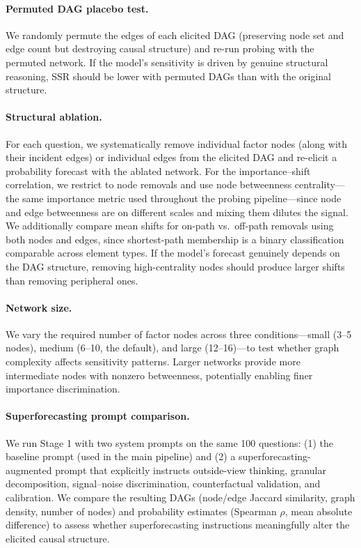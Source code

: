 \documentclass[11pt]{article}
\begin{document}
\paragraph{Permuted DAG placebo test.} We randomly permute the edges of each elicited DAG (preserving node set and edge count but destroying causal structure) and re-run probing with the permuted network. If the model's sensitivity is driven by genuine structural reasoning, SSR should be lower with permuted DAGs than with the original structure.

\paragraph{Structural ablation.} For each question, we systematically remove individual factor nodes (along with their incident edges) or individual edges from the elicited DAG and re-elicit a probability forecast with the ablated network. For the importance--shift correlation, we restrict to node removals and use node betweenness centrality---the same importance metric used throughout the probing pipeline---since node and edge betweenness are on different scales and mixing them dilutes the signal. We additionally compare mean shifts for on-path vs.\ off-path removals using both nodes and edges, since shortest-path membership is a binary classification comparable across element types. If the model's forecast genuinely depends on the DAG structure, removing high-centrality nodes should produce larger shifts than removing peripheral ones.

\paragraph{Network size.} We vary the required number of factor nodes across three conditions---small (3--5 nodes), medium (6--10, the default), and large (12--16)---to test whether graph complexity affects sensitivity patterns. Larger networks provide more intermediate nodes with nonzero betweenness, potentially enabling finer importance discrimination.

\paragraph{Superforecasting prompt comparison.} We run Stage 1 with two system prompts on the same 100 questions: (1) the baseline prompt (used in the main pipeline) and (2) a superforecasting-augmented prompt that explicitly instructs outside-view thinking, granular decomposition, signal--noise discrimination, counterfactual validation, and calibration. We compare the resulting DAGs (node/edge Jaccard similarity, graph density, number of nodes) and probability estimates (Spearman $\rho$, mean absolute difference) to assess whether superforecasting instructions meaningfully alter the elicited causal structure.
\end{document}
